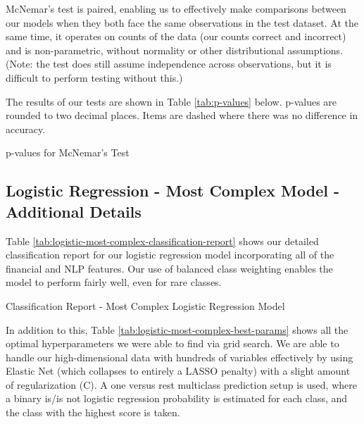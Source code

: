 \documentclass{article}[11pt]
\begin{document}
    McNemar's test is paired, enabling us to effectively make comparisons between our models when they both face the same observations in the test dataset. At the same time, it operates on counts of the data (our counts correct and incorrect) and is non-parametric, without normality or other distributional assumptions. (Note: the test does still assume independence across observations, but it is difficult to perform testing without this.)

    The results of our tests are shown in Table \ref{tab:p-values} below. p-values are rounded to two decimal places. Items are dashed where there was no difference in accuracy.

    \begin{table}[h!]
        \centering
        \caption{p-values for McNemar's Test}
        
        \label{tab:p-values}
    \end{table}

    \clearpage
    \newpage
    \subsection{Logistic Regression - Most Complex Model - Additional Details}

    \label{sec:logistic-most-complex-model-additional-details}

    Table \ref{tab:logistic-most-complex-classification-report} shows our detailed classification report for our logistic regression model incorporating all of the financial and NLP features. Our use of balanced class weighting enables the model to perform fairly well, even for rare classes.

    \begin{table}[h!]
        \centering
        \caption{Classification Report - Most Complex Logistic Regression Model}
        
        \label{tab:logistic-most-complex-classification-report}
    \end{table}

    In addition to this, Table \ref{tab:logistic-most-complex-best-params} shows all the optimal hyperparameters we were able to find via grid search. We are able to handle our high-dimensional data with hundreds of variables effectively by using Elastic Net (which collapses to entirely a LASSO penalty) with a slight amount of regularization (C). A one versus rest multiclass prediction setup is used, where a binary is/is not logistic regression probability is estimated for each class, and the class with the highest score is taken.
\end{document}
